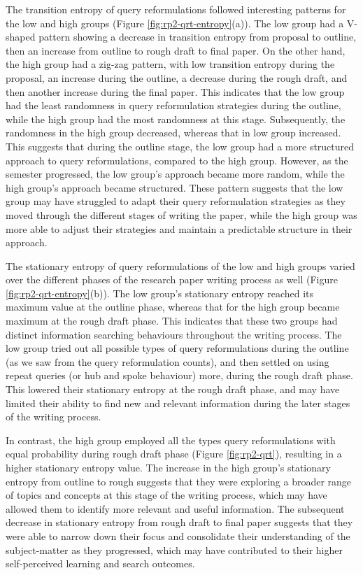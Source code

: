 \documentclass[letterpaper, nobind]{templates/ociamthesis}
\begin{document}
The transition entropy of query reformulations followed interesting patterns for the low and high groups (Figure \ref{fig:rp2-qrt-entropy}(a)).
The low group had a V-shaped pattern showing a decrease in transition entropy from proposal to outline, then an increase from outline to rough draft to final paper.
On the other hand, the high group had a zig-zag pattern, with low transition entropy during the proposal, an increase during the outline, a decrease during the rough draft, and then another increase during the final paper.
This indicates that the low group had the least randomness in query reformulation strategies during the outline, while the high group had the most randomness at this stage.
Subsequently, the randomness in the high group decreased, whereas that in low group increased.
This suggests that during the outline stage, the low group had a more structured approach to query reformulations, compared to the high group.
However, as the semester progressed, the low group's approach became more random, while the high group's approach became structured.
These pattern suggests that the low group may have struggled to adapt their query reformulation strategies as they moved through the different stages of writing the paper, while the high group was more able to adjust their strategies and maintain a predictable structure in their approach.

The stationary entropy of query reformulations of the low and high groups varied over the different phases of the research paper writing process as well (Figure \ref{fig:rp2-qrt-entropy}(b)).
The low group's stationary entropy reached its maximum value at the outline phase, whereas that for the high group became maximum at the rough draft phase.
This indicates that these two groups had distinct information searching behaviours throughout the writing process.
The low group tried out all possible types of query reformulations during the outline (as we saw from the query reformulation counts), and then settled on using repeat queries (or hub and spoke behaviour) more, during the rough draft phase.
This lowered their stationary entropy at the rough draft phase, and may have limited their ability to find new and relevant information during the later stages of the writing process.

In contrast, the high group employed all the types query reformulations with equal probability during rough draft phase (Figure \ref{fig:rp2-qrt}), resulting in a higher stationary entropy value.
The increase in the high group's stationary entropy from outline to rough suggests that they were exploring a broader range of topics and concepts at this stage of the writing process, which may have allowed them to identify more relevant and useful information.
The subsequent decrease in stationary entropy from rough draft to final paper suggests that they were able to narrow down their focus and consolidate their understanding of the subject-matter as they progressed, which may have contributed to their higher self-perceived learning and search outcomes.
\end{document}
